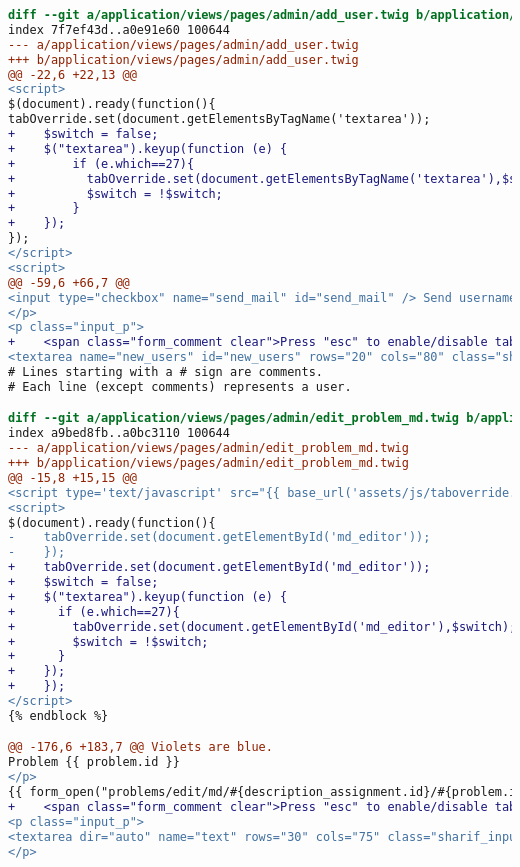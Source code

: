 \begin{lstlisting}[language=diff, caption=Perubahan untuk mematuhi kriteria 2.1.2, label=lst_2.1.2, basicstyle=\ttfamily, frame=single,
columns=fullflexible, keepspaces=true, breaklines=true]
diff --git a/application/views/pages/admin/add_user.twig b/application/views/pages/admin/add_user.twig
index 7f7ef43d..a0e91e60 100644
--- a/application/views/pages/admin/add_user.twig
+++ b/application/views/pages/admin/add_user.twig
@@ -22,6 +22,13 @@
<script>
$(document).ready(function(){
tabOverride.set(document.getElementsByTagName('textarea'));
+    $switch = false;
+    $("textarea").keyup(function (e) {
+        if (e.which==27){
+          tabOverride.set(document.getElementsByTagName('textarea'),$switch);
+          $switch = !$switch;
+        }
+    });
});
</script>
<script>
@@ -59,6 +66,7 @@
<input type="checkbox" name="send_mail" id="send_mail" /> Send usernames and passwords by email (Waits <input type="text" name="delay" id="delay" class="sharif_input tiny" value="2"/> second(s) before sending each email, so please be patient).
</p>
<p class="input_p">
+    <span class="form_comment clear">Press "esc" to enable/disable tabindent</span><br>
<textarea name="new_users" id="new_users" rows="20" cols="80" class="sharif_input">
# Lines starting with a # sign are comments.
# Each line (except comments) represents a user.

diff --git a/application/views/pages/admin/edit_problem_md.twig b/application/views/pages/admin/edit_problem_md.twig
index a9bed8fb..a0bc3110 100644
--- a/application/views/pages/admin/edit_problem_md.twig
+++ b/application/views/pages/admin/edit_problem_md.twig
@@ -15,8 +15,15 @@
<script type='text/javascript' src="{{ base_url('assets/js/taboverride.min.js') }}"></script>
<script>
$(document).ready(function(){
-    tabOverride.set(document.getElementById('md_editor'));
-    });
+    tabOverride.set(document.getElementById('md_editor'));
+    $switch = false;
+    $("textarea").keyup(function (e) {
+      if (e.which==27){
+        tabOverride.set(document.getElementById('md_editor'),$switch);
+        $switch = !$switch;
+      }
+    });
+    });
</script>
{% endblock %}

@@ -176,6 +183,7 @@ Violets are blue.
Problem {{ problem.id }}
</p>
{{ form_open("problems/edit/md/#{description_assignment.id}/#{problem.id}") }}
+    <span class="form_comment clear">Press "esc" to enable/disable tabindent</span><br>
<p class="input_p">
<textarea dir="auto" name="text" rows="30" cols="75" class="sharif_input" id="md_editor">{{ problem.description }}</textarea>
</p>


\end{lstlisting}
